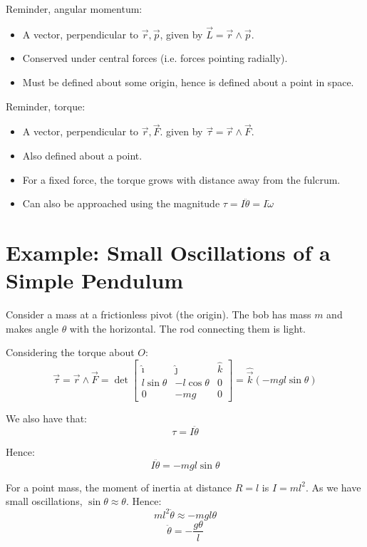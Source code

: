 
Reminder, angular momentum:
\begin{itemize}
    \item A vector, perpendicular to $\vec{r}, \vec{p}$, given by $\vec{L} = \vec{r} \wedge \vec{p}$.
    \item Conserved under central forces (i.e. forces pointing radially). 
    \item Must be defined about some origin, hence is defined about a point in space.
\end{itemize}

Reminder, torque:
\begin{itemize}
    \item A vector, perpendicular to $\vec{r}, \vec{F}$. given by $\vec{\tau} = \vec{r} \wedge \vec{F}$.
    \item Also defined about a point.
    \item For a fixed force, the torque grows with distance away from the fulcrum.
    \item Can also be approached using the magnitude $\tau = I \ddot{\theta} = I\dot{\omega}$
\end{itemize}

\section{Example: Small Oscillations of a Simple Pendulum}
Consider a mass at a frictionless pivot (the origin). The bob has mass $m$ and makes angle $\theta$ with the horizontal. The rod connecting them is light.

Considering the torque about $O$:
\[
    \vec{\tau} = \vec{r} \wedge \vec{F} = \det \begin{bmatrix}
        \hat{\imath} & \hat{\jmath} & \hat{k} \\
        l \sin \theta & -l \cos \theta & 0 \\
        0 & -mg & 0
    \end{bmatrix} = \hat{\vec{k}} \left(-mg l \sin \theta\right)
\]

We also have that:
\[
    \tau = I \ddot{\theta}
\]

Hence:
\[
    I \ddot{\theta} = -mg l \sin \theta \tag{1}
\]

For a point mass, the moment of inertia at distance $R = l$ is $I = ml^2$. As we have small oscillations, $\sin \theta \approx \theta$. Hence:
\[
    ml^2 \ddot{\theta} \approx -mgl \theta
\]
\[
    \ddot{\theta} = - \frac{g \theta}{l}
\]

